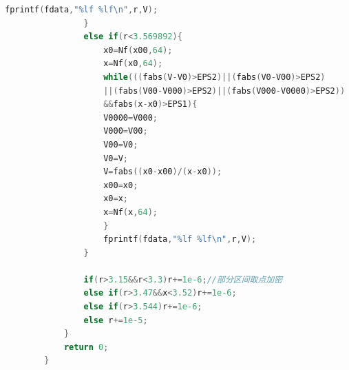 \documentclass[10pt, a4paper]{article}
\begin{document}
\begin{lstlisting}[language=C]
                    fprintf(fdata,"%lf %lf\n",r,V); 
                }
                else if(r<3.569892){
                    x0=Nf(x00,64);
                    x=Nf(x0,64);
                    while(((fabs(V-V0)>EPS2)||(fabs(V0-V00)>EPS2)
                    ||(fabs(V00-V000)>EPS2)||(fabs(V000-V0000)>EPS2))
                    &&fabs(x-x0)>EPS1){
                    V0000=V000;
                    V000=V00;
                    V00=V0;
                    V0=V;
                    V=fabs((x0-x00)/(x-x0));
                    x00=x0;
                    x0=x;
                    x=Nf(x,64);
                    }
                    fprintf(fdata,"%lf %lf\n",r,V); 
                }
                
                if(r>3.15&&r<3.3)r+=1e-6;//部分区间取点加密
                else if(r>3.47&&x<3.52)r+=1e-6;
                else if(r>3.544)r+=1e-6;
                else r+=1e-5;
            }
            return 0;
        }
    \end{lstlisting}
\end{document}
